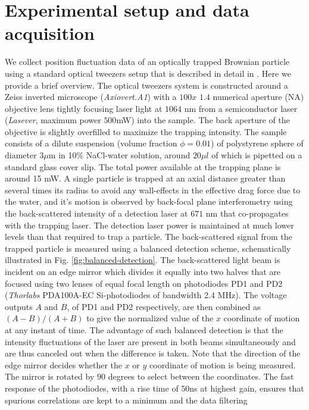 \documentclass[english,aps, onecolumn, prl,superscriptaddress, notitlepage]{revtex4-1}
\begin{document}
\section{Experimental setup and data acquisition\label{sec:Experimental-setup-and}}
We collect position fluctuation data of an optically trapped Brownian
particle using a standard optical tweezers setup that is described
in detail in \cite{rsi12}. Here we provide a brief overview. The
optical tweezers system is constructed around a Zeiss inverted microscope
(\emph{Axiovert.A1}) with a $100x$ $1.4$ numerical aperture (NA)
objective lens tightly focusing laser light at $1064$ nm from a semiconductor
laser (\emph{Lasever}, maximum power $500$mW) into the sample. The
back aperture of the objective is slightly overfilled to maximize
the trapping intensity. The sample consists of a dilute suspension
(volume fraction $\phi=0.01$) of polystyrene sphere of diameter $3\mu$m
in 10\% NaCl-water solution, around $20\mu l$ of which is pipetted
on a standard glass cover slip. The total power available at the trapping
plane is around 15 mW. A single particle is trapped at an axial distance
greater than several times its radius to avoid any wall-effects in
the effective drag force due to the water, and it's motion is observed
by back-focal plane interferometry using the back-scattered intensity
of a detection laser at $671$ nm that co-propagates with the trapping
laser. The detection laser power is maintained at much lower levels
than that required to trap a particle. The back-scattered signal from
the trapped particle is measured using a balanced detection scheme,
schematically illustrated in Fig. \ref{fig:balanced-detection}. The
back-scattered light beam is incident on an edge mirror which divides
it equally into two halves that are focused using two lenses of equal
focal length on photodiodes PD1 and PD2 (\emph{Thorlabs} PDA100A-EC
Si-photodiodes of bandwidth 2.4 MHz). The voltage outputs $A$ and
$B$, of PD1 and PD2 respectively, are then combined as $(A-B)/(A+B)$
to give the normalized value of the $x$ coordinate of motion at any
instant of time. The advantage of such balanced detection is that
the intensity fluctuations of the laser are present in both beams
simultaneously and are thus canceled out when the difference is taken.
Note that the direction of the edge mirror decides whether the $x$
or $y$ coordinate of motion is being measured. The mirror is rotated
by $90$ degrees to select between the coordinates. The fast response
of the photodiodes, with a rise time of 50ns at highest gain, ensures
that spurious correlations are kept to a minimum and the data filtering
\end{document}
